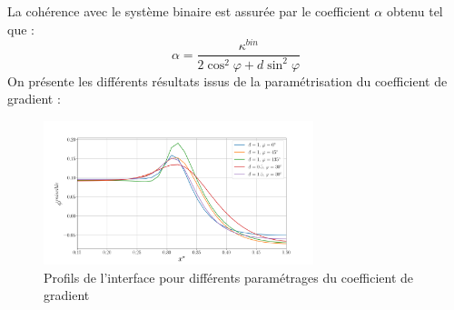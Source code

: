 La cohérence avec le système binaire est assurée par le coefficient $\alpha$ obtenu tel que :
\begin{equation}
\alpha = \frac{\kappa^{bin}}{2\cos^2\varphi + d \sin^2\varphi}
\end{equation}
On présente les différents résultats issus de la paramétrisation du coefficient de gradient : 
\begin{figure}[H]
		\centering
		\includegraphics[width=0.7\textwidth]{figure/ProfInterfStatio2.png}
		\caption{Profils de l'interface pour différents paramétrages du coefficient de gradient}
\end{figure}

